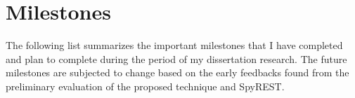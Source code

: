 \documentclass[11pt,oneside]{book}
\begin{document}



% 
% 
% 
% 
% 

\clearpage
\section{Milestones}

The following list summarizes the important milestones that I have completed and plan to complete during the period of my dissertation research. The future milestones are subjected to change based on the early feedbacks found from the preliminary evaluation of the proposed technique and SpyREST.
\end{document}
